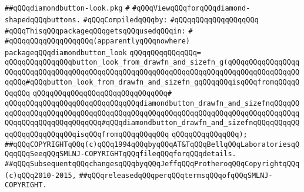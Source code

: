 \label{src/lib/x-kit/widget/old/leaf/diamondbutton-look.pkg}
\verb|##qQQqdiamondbutton-look.pkg|\newline
\verb|#|\newline
\verb|#qQQqViewqQQqforqQQqdiamond-shapedqQQqbuttons.|\newline
\newline
\verb|#qQQqCompiledqQQqby:|\newline
\verb|#qQQqqQQqqQQqqQQqqQQq|\newline
\newline
\newline
\newline
\newline
\verb|#qQQqThisqQQqpackageqQQqgetsqQQqusedqQQqin:|\newline
\verb|#|\newline
\verb|#qQQqqQQqqQQqqQQqqQQq(apparentlyqQQqnowhere)|\newline
\newline
\verb|packageqQQqdiamondbutton_look|\newline
\verb|qQQqqQQqqQQqqQQq=|\newline
\verb|qQQqqQQqqQQqqQQqbutton_look_from_drawfn_and_sizefn_g(qQQqqQQqqQQqqQQqqQQqqQQqqQQqqQQqqQQqqQQqqQQqqQQqqQQqqQQqqQQqqQQqqQQqqQQqqQQqqQQqqQQqqQQqqQQq#qQQqbutton_look_from_drawfn_and_sizefn_gqQQqqQQqisqQQqfromqQQqqQQqqQQq|\newline
\verb|qQQqqQQqqQQqqQQqqQQqqQQqqQQqqQQq#|\newline
\verb|qQQqqQQqqQQqqQQqqQQqqQQqqQQqqQQqdiamondbutton_drawfn_and_sizefnqQQqqQQqqQQqqQQqqQQqqQQqqQQqqQQqqQQqqQQqqQQqqQQqqQQqqQQqqQQqqQQqqQQqqQQqqQQqqQQqqQQqqQQqqQQqqQQqqQQq#qQQqdiamondbutton_drawfn_and_sizefnqQQqqQQqqQQqqQQqqQQqqQQqqQQqisqQQqfromqQQqqQQqqQQq|\newline
\verb|qQQqqQQqqQQqqQQq);|\newline
\newline
\newline
\verb|##qQQqCOPYRIGHTqQQq(c)qQQq1994qQQqbyqQQqAT&TqQQqBellqQQqLaboratoriesqQQqqQQqSeeqQQqSMLNJ-COPYRIGHTqQQqfileqQQqforqQQqdetails.|\newline
\verb|##qQQqSubsequentqQQqchangesqQQqbyqQQqJeffqQQqProtheroqQQqCopyrightqQQq(c)qQQq2010-2015,|\newline
\verb|##qQQqreleasedqQQqperqQQqtermsqQQqofqQQqSMLNJ-COPYRIGHT.|\newline

